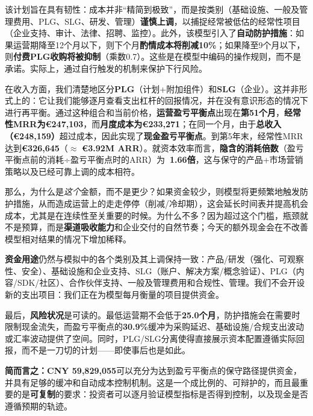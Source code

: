 \documentclass[11pt, a4paper, oneside]{article}
\begin{document}
该计划旨在具有韧性：成本并非“精简到极致”，而是按类别（基础设施、一般及管理费用、PLG、SLG、研发、管理）\textbf{谨慎上调}，以捕捉经常被低估的经常性项目（企业支持、审计、法律、招聘、监控）。此外，该模型引入了\textbf{自动防护措施}：如果运营期降至12个月以下，则下个月\textbf{酌情成本将削减10\%}；如果降至9个月以下，则\textbf{付费PLG收购将被抑制}（乘数0.7）。这些是在模型中编码的操作规则，而不是承诺。实际上，通过自行触发的机制来保护下行风险。

在收入方面，我们清楚地区分\textbf{PLG}（计划+附加组件）和\textbf{SLG}（企业）。这并非形式上的：它让我们能够逐月查看支出杠杆的回报情况，并在没有意识形态的情况下进行再平衡。通过这种组合和当前价格，\textbf{运营盈亏平衡点}出现在\textbf{第51个月}，\textbf{经常性MRR为€247{,}103}，而\textbf{月度成本为€233{,}271}；在同一个月，由于\textbf{总收入（€248{,}159）}超过成本，因此实现了\textbf{现金盈亏平衡点}。到第5年末，经常性MRR达到\textbf{€326{,}645}（$\approx$ \textbf{€3.92M ARR}）。就资本效率而言，\textbf{隐含的消耗倍数}（盈亏平衡点前的消耗÷盈亏平衡点时的ARR）为\textbf{~1.66倍}，这与保守的产品+市场营销策略以及已经可靠上调的成本相符。

那么，为什么是\emph{这个}金额，而不是更少？如果资金较少，则模型将更频繁地触发防护措施，从而造成运营上的走走停停（削减/冷却期），这会延长时间表并提高机会成本，尤其是在连续性至关重要的时候。为什么不多？因为超过这个门槛，瓶颈就不是预算，而是\textbf{渠道吸收能力}和企业交付的自然节奏；今天的额外现金会在不改善模型相对结果的情况下增加稀释。

\textbf{资金用途}仍然与模拟中的各个类别及其上调保持一致：产品/研发（强化、可观察性、安全）、基础设施和企业支持、SLG（账户、解决方案/概念验证）、PLG（内容/SDK/社区）、合作伙伴支持、一般及管理费用和合规性、管理。我们不会开设新的支出项目：我们正在为模型每月衡量的项目提供资金。

最后，\textbf{风险状况}是可读的。最低运营期不会低于\textbf{25.0个月}，防护措施会在需要时限制现金流失，而盈亏平衡点的\textbf{30.9\%}缓冲为采购延迟、基础设施/合规支出波动或汇率波动提供了空间。同时，PLG/SLG分离使得直接展示资本配置遵循实际回报，而不是一刀切的计划——即使事后也是如此。

\textbf{简而言之：}\textbf{CNY 59{,}829{,}055}可以充分为达到盈亏平衡点的保守路径提供资金，并具有足够的缓冲和自动成本控制机制。这是一个成比例的、可辩护的，而且最重要的是\textbf{可复制}的要求：投资者可以逐月验证模型指标是否得到控制，以及现金是否遵循预期的轨迹。
\end{document}
